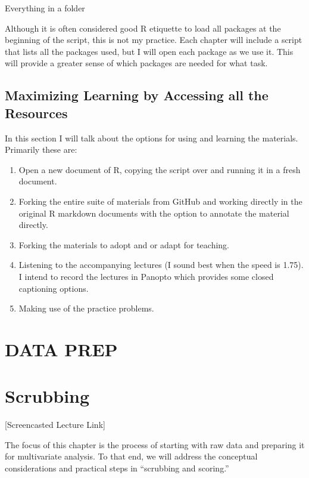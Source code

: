 \documentclass[
  english,
]{book}
\providecommand{\tightlist}{%
  \setlength{\itemsep}{0pt}\setlength{\parskip}{0pt}}
\begin{document}
Everything in a folder

Although it is often considered good R etiquette to load all packages at the beginning of the script, this is not my practice. Each chapter will include a script that lists all the packages used, but I will open each package as we use it. This will provide a greater sense of which packages are needed for what task.

\hypertarget{maximizing-learning-by-accessing-all-the-resources}{%
\section{Maximizing Learning by Accessing all the Resources}\label{maximizing-learning-by-accessing-all-the-resources}}

In this section I will talk about the options for using and learning the materials. Primarily these are:

\begin{enumerate}
\def\labelenumi{\arabic{enumi}.}
\tightlist
\item
  Open a new document of R, copying the script over and running it in a fresh document.
\item
  Forking the entire suite of materials from GitHub and working directly in the original R markdown documents with the option to annotate the material directly.
\item
  Forking the materials to adopt and or adapt for teaching.
\item
  Listening to the accompanying lectures (I sound best when the speed is 1.75). I intend to record the lectures in Panopto which provides some closed captioning options.
\item
  Making use of the practice problems.
\end{enumerate}

\hypertarget{dataprep}{%
\chapter*{DATA PREP}\label{dataprep}}

\hypertarget{scrub}{%
\chapter{Scrubbing}\label{scrub}}

{[}Screencasted Lecture Link{]}

The focus of this chapter is the process of starting with raw data and preparing it for multivariate analysis. To that end, we will address the conceptual considerations and practical steps in ``scrubbing and scoring.''
\end{document}
